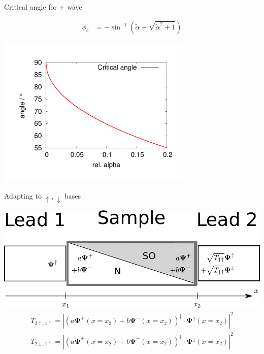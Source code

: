 \documentclass{beamer}
\newcommand{\ta}{\ensuremath{\tilde\alpha}}
\begin{document}
\begin{frame}{Critical angle for $+$ wave}
    \begin{center}
        \begin{align*}
            \phi_c          &= -\sin ^{-1}\left(\ta-\sqrt{\ta^2+1}\right)
        \end{align*}

        \includegraphics[width=0.7\textwidth]{critical-angle.pdf}
    \end{center}
\end{frame}

\begin{frame}{Adapting to $\uparrow, \downarrow$ bases}
    \begin{center}
        \includegraphics[width=\textwidth]{adapting-pic.pdf}
        \begin{align*}
            T_{2\uparrow,1\uparrow} = \left| \left( 
                a \mathbf{\Psi^+}(x=x_2) + b  \mathbf{\Psi^-}(x=x_2)
            \right)^\dagger \cdot \mathbf{\Psi}^\uparrow(x=x_2) \right|^2\nonumber\\
            T_{2\downarrow,1\uparrow} = \left| \left( 
                a \mathbf{\Psi^+}(x=x_2) + b  \mathbf{\Psi^-}(x=x_2)
            \right)^\dagger \cdot \mathbf{\Psi}^\downarrow(x=x_2) \right|^2\nonumber
        \end{align*}
    \end{center}

\end{frame}
\end{document}
